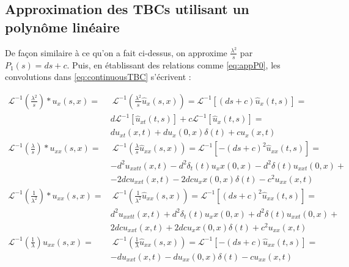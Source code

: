 \subsection{Approximation des TBCs utilisant un polynôme linéaire}

\indent De façon similaire à ce qu'on a fait ci-dessus, on approxime $\frac{\lambda^2}{s}$ par $P_1(s) = ds + c$. Puis, en établissant des relations comme \eqref{eq:appP0}, les convolutions dans \eqref{eq:continuousTBC} s'écrivent :

\begin{equation*}
	\begin{aligned}
    \mathcal{L}^{-1} \left( \frac{\lambda^2}{s}\right) *  u_x(s,x)   =  & \  \mathcal{L}^{-1} \left( \frac{\lambda^2}{s} \hat{u}_x(s,x) \right) =  \mathcal{L}^{-1} \left[ (ds+c) \hat{u}_x(t,s) \right] = \\
    			 & d\mathcal{L}^{-1} \left[ \hat{u}_{xt}(t,s) \right] + c \mathcal{L}^{-1} \left[ \hat{u}_{x}(t,s) \right] = \\
    			 &   du_{xt}(x,t) + du_x(0,x)\delta (t) + cu_x(x,t) \\
    \mathcal{L}^{-1} \left( \frac{\lambda}{s} \right) * u_{xx}(s,x)  = & \   \mathcal{L}^{-1} \left( \frac{\lambda}{s} \hat{u}_{xx}(s,x) \right) =  \mathcal{L}^{-1} \left[ -(ds+c)^2 \hat{u}_{xx}(t,s) \right] =\\
    			&  -d^2u_{xxtt}(x,t) - d^2\delta_t(t) u_xx(0,x) - d^2 \delta(t)u_{xxt}(0,x)  + \\ 
    			& - 2dcu_{xxt}(x,t) -  2dcu_xx(0,x)\delta (t) - c^2u_{xx}(x,t) \\
     \mathcal{L}^{-1} \left( \frac{1}{\lambda^2} \right) * u_{xx}(s,x)  = & \  \mathcal{L}^{-1} \left( \frac{1}{\lambda^2} \hat{u}_{xx}(s,x) \right) = \mathcal{L}^{-1} \left[ (ds+c)^2 \hat{u}_{xx}(t,s) \right] = \\
    			& d^2u_{xxtt}(x,t) + d^2\delta_t(t) u_xx(0,x) + d^2 \delta(t)u_{xxt}(0,x)  + \\
    			& 2dcu_{xxt}(x,t) +  2dcu_xx(0,x)\delta (t) + c^2u_{xx}(x,t) \\
     \mathcal{L}^{-1} \left( \frac{1}{\lambda} \right) u_{xx}(s,x) = & \  \mathcal{L}^{-1} \left( \frac{1}{\lambda} \hat{u}_{xx}(s,x) \right) = \mathcal{L}^{-1} \left[ -(ds+c) \hat{u}_{xx}(t,s) \right] = \\
    			& -du_{xxt}(x,t) - du_{xx}(0,x)\delta (t) - cu_{xx}(x,t)
\end{aligned}
\end{equation*}

